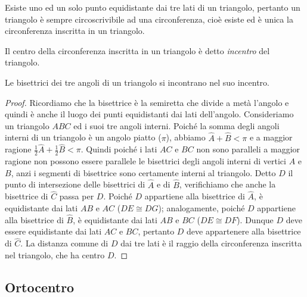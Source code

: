 Esiste uno ed un solo punto equidistante dai tre lati di un 
triangolo, pertanto un triangolo è sempre circoscrivibile ad una 
circonferenza, cioè esiste ed è unica la circonferenza inscritta in un 
triangolo.

\begin{definizione}
Il centro della circonferenza inscritta in un triangolo è detto 
\emph{incentro} del triangolo.
\end{definizione}

\begin{teorema}
Le bisettrici dei tre angoli di un triangolo si incontrano nel suo 
incentro.
\end{teorema}


\begin{inaccessibleblock}
 \begin{figure}[htb]
	\centering
\end{figure}
\end{inaccessibleblock}
\begin{proof}
Ricordiamo che la bisettrice è la semiretta che divide a metà 
l'angolo e quindi è anche il luogo dei punti equidistanti dai lati 
dell'angolo. Consideriamo un triangolo $ABC$ ed i suoi tre angoli 
interni. Poiché la somma degli angoli interni di un triangolo è un 
angolo piatto ($\pi$), abbiamo $\widehat{A}+\widehat{B}<\pi$ e a 
maggior ragione $\frac{1}{2}\widehat{A}+\frac{1}{2}\widehat{B}<\pi$. 
Quindi poiché i lati $AC$ e $BC$ non sono paralleli a maggior ragione 
non possono essere parallele le bisettrici degli angoli interni di 
vertici $A$ e $B$, anzi i segmenti di bisettrice sono certamente 
interni al triangolo. Detto $D$ il punto di intersezione delle 
bisettrici di $\widehat{A}$ e di $\widehat{B}$, verifichiamo che anche 
la bisettrice di $\widehat{C}$ passa per $D$. Poiché $D$ appartiene 
alla bisettrice di $\widehat{A}$, è equidistante dai lati $AB$ e $AC$ 
($DE\cong DG$); analogamente, poiché $D$ appartiene alla bisettrice di 
$\widehat{B}$, è equidistante dai lati $AB$ e $BC$ ($DE\cong DF$). 
Dunque $D$ deve essere equidistante dai lati $AC$ e $BC$, pertanto $D$ 
deve appartenere alla bisettrice di $\widehat{C}$. La distanza comune 
di $D$ dai tre lati è il raggio della circonferenza inscritta nel 
triangolo, che ha centro $D$.
\end{proof}

\subsection{Ortocentro}

